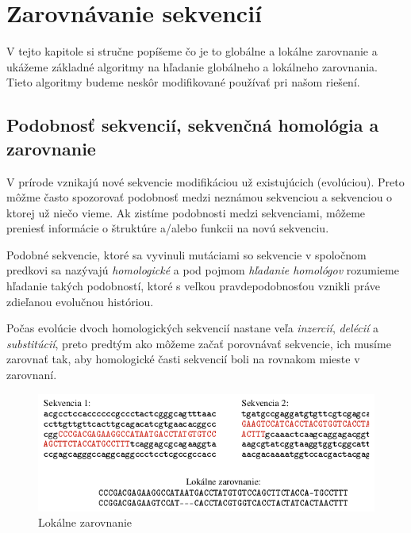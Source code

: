 \chapter{Zarovnávanie sekvencií}

V tejto kapitole si stručne popíšeme čo je to globálne a lokálne zarovnanie a ukážeme základné algoritmy na hľadanie globálneho a lokálneho zarovnania. Tieto algoritmy budeme neskôr modifikované používať pri našom riešení.

\section{Podobnosť sekvencií, sekvenčná homológia a zarovnanie}
V prírode vznikajú nové sekvencie modifikáciou už existujúcich (evolúciou). Preto môžme často spozorovať podobnosť medzi neznámou sekvenciou a sekvenciou o ktorej už niečo vieme. Ak zistíme podobnosti medzi sekvenciami, môžeme preniesť informácie o štruktúre a/alebo funkcii na novú sekvenciu.

Podobné sekvencie, ktoré sa vyvinuli mutáciami so sekvencie v spoločnom predkovi sa nazývajú \textit{homologické} a pod pojmom \textit{hľadanie homológov} rozumieme hľadanie takých podobností, ktoré s veľkou pravdepodobnosťou vznikli práve zdieľanou evolučnou históriou.



Počas evolúcie dvoch homologických sekvencií nastane veľa \textit{inzercií}, \textit{delécií} a \textit{substitúcií}, preto predtým ako môžeme začať porovnávať sekvencie, ich musíme zarovnať tak, aby homologické časti sekvencií boli na rovnakom mieste v zarovnaní.
\cite{durbin, skripta}

\begin{figure}[hbtp]
    \centering
    \includegraphics[width=\textwidth]{images/zarovnanie}
    \caption{Lokálne zarovnanie}
    \label{fig:alignment_example}
\end{figure}


